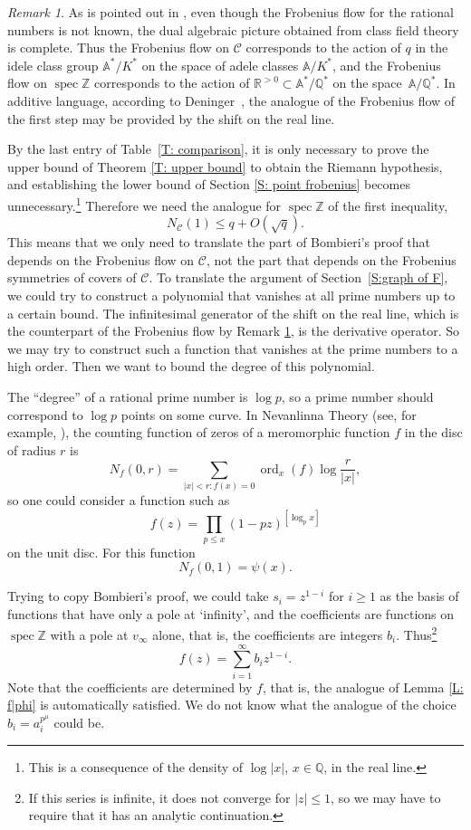 \documentclass{amsart}
\newcommand\ord{\operatorname{ord}}
\newcommand\Z{\mathbb{Z}}	\newcommand\C{\mathbb{C}}
\newcommand\Q{\mathbb{Q}}	\newcommand\R{\mathbb{R}}
\newcommand\spec{\operatorname{spec}}
\newcommand\Curve{\mathcal{C}}
\newcommand\A{\mathbb{A}}
\theoremstyle{definition}\newtheorem{definition}[theorem]{Definition}
\theoremstyle{remark}\newtheorem{remark}[theorem]{Remark}
\numberwithin{equation}{section}
\begin{document}
\begin{remark}\label{R: shift}
As is pointed out in \cite[Remark~c, p.~72]{Connes},
even though the Frobenius flow for the rational numbers is not known,
the dual algebraic picture obtained from class field theory is complete.
Thus the Frobenius flow on $\Curve$ corresponds to the action of $q$ in the idele class group $\A^*/K^*$ on the space of adele classes $\A/K^*$,
 and the Frobenius flow on $\spec\Z$ corresponds to the action of $\R^{>0}\subset\A^*/\Q^*$ on the space~$\A/\Q^*$.
In additive language,
according to Deninger~\cite{cD93,cD93a},
the analogue of the Frobenius flow of the first step may be provided by the shift on the real line.
\end{remark}

By the last entry of Table~\ref{T: comparison},
it is only necessary to prove the upper bound of Theorem \ref{T: upper bound} to obtain the Riemann hypothesis,
and establishing the lower bound of Section \ref{S: point frobenius} becomes unnecessary.\footnote
{This is a consequence of the density of $\log|x|$,
$x\in\Q$,
in the real line.}
Therefore we need the analogue for $\spec\Z$ of the first inequality,
$$
N_\Curve(1)\leq q+O(\sqrt q).
$$
This means that we only need to translate the part of Bombieri's proof that depends on the Frobenius flow on $\Curve$,
not the part that depends on the Frobenius symmetries of covers of $\Curve$.
To translate the argument of Section~\ref{S:graph of F},
we could try to construct a polynomial that vanishes at all prime numbers up to a certain bound.
The infinitesimal generator of the shift on the real line,
which is the counterpart of the Frobenius flow by Remark \ref{R: shift},
 is the derivative operator.
So we may try to construct such a function that vanishes at the prime numbers to a high order.
Then we want to bound the degree of this polynomial.

The ``degree'' of a rational prime number is $\log p$,
so a prime number should correspond to $\log p$ points on some curve.
In Nevanlinna Theory (see,
for example,
\cite{Hayman,LC}),
the counting function of zeros of a meromorphic function $f$ in the disc of radius $r$ is
$$
N_f(0,r)=\sum_{|x|<r\colon f(x)=0}\ord_x(f)\log\frac{r}{|x|},
$$
so one could consider a function such as
$$
f(z)=\prod_{p\leq x}(1-pz)^{[\log_px]}
$$
 on the unit disc.
For this function
$$
N_f(0,1)=\psi(x).
$$

Trying to copy Bombieri's proof,
we could take $s_i=z^{1-i}$ for $i\geq1$ as the basis of functions that have only a pole at `infinity',
and the coefficients are functions on~$\spec\Z$ with a pole at $v_\infty$ alone,
that is,
the coefficients are integers $b_i$.
Thus\footnote
{If this series is infinite,
 it does not converge for $|z|\leq1$,
so we may have to require that it has an analytic continuation.}
$$
f(z)=\sum_{i=1}^\infty b_iz^{1-i}.
$$
Note that the coefficients are determined by $f$,
that is,
the analogue of Lemma \ref{L: f|phi} is automatically satisfied.
We do not know what the analogue of the choice $b_i=a_i^{p^\mu}$ could be.
\end{document}
